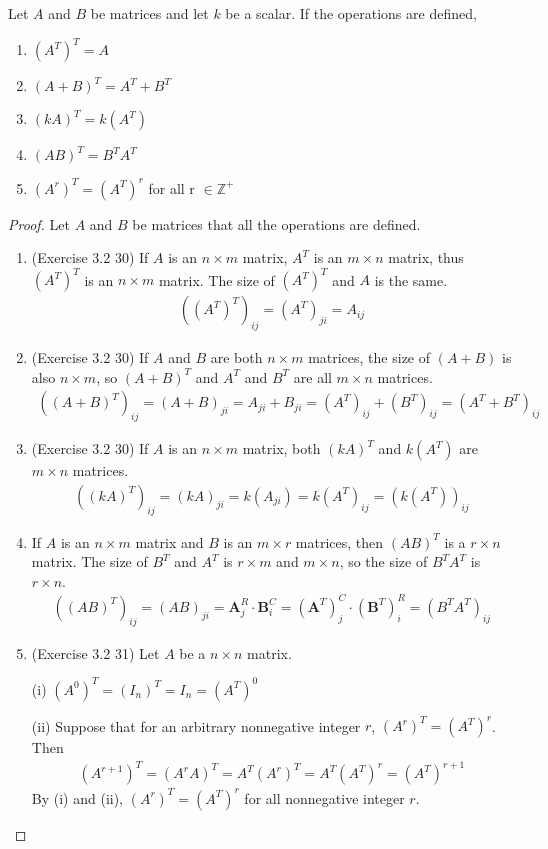 \begin{theorem} 
	Let $A$ and $B$ be matrices and let $k$ be a scalar. If the operations are defined,
	\begin{enumerate}
		\item $(A^{T})^{T} = A$
		\item $(A+B)^{T} = A^{T} + B^{T}$
		\item $(kA)^{T} = k(A^{T})$
		\item $(AB)^{T} = B^{T}A^{T}$
		\item $(A^{r})^{T} = (A^{T})^{r}$ for all r $\in \mathbb{Z}^{+}$
	\end{enumerate}
\end{theorem}

\begin{proof}
	Let $A$ and $B$ be matrices that all the operations are defined.
	\begin{enumerate}
		\item (Exercise 3.2 30) If $A$ is an $n \times m$ matrix, $A^{T}$ is an $m \times n$ matrix, thus $(A^{T})^{T}$ is an $n \times m$ matrix. The size of $(A^{T})^{T}$ and $A$ is the same.
		\begin{align*}
		((A^{T})^{T})_{ij} = (A^{T})_{ji} = A_{ij}			
		\end{align*}
		\item (Exercise 3.2 30) If $A$ and $B$ are both $n \times m$ matrices, the size of $(A+B)$ is also $n \times m$, so $(A+B)^{T}$ and $A^{T}$ and $B^{T}$ are all $m \times n$ matrices.
		\begin{align*}
		((A+B)^{T})_{ij} = (A+B)_{ji} = A_{ji} + B_{ji} = (A^{T})_{ij} + (B^{T})_{ij} = (A^{T} + B^{T})_{ij}
		\end{align*}
		\item (Exercise 3.2 30) If $A$ is an $n \times m$ matrix, both $(kA)^{T}$ and $k(A^{T})$ are $m \times n$ matrices.
		\begin{align*}
		((kA)^{T})_{ij} = (kA)_{ji} = k(A_{ji}) = k(A^{T})_{ij} = (k(A^{T}))_{ij}
		\end{align*}
		\item If $A$ is an $n \times m$ matrix and $B$ is an $m \times r$ matrices, then $(AB)^{T}$ is a $r \times n$ matrix. The size of $B^{T}$ and $A^{T}$ is $r \times m$ and $m \times n$, so the size of $B^{T}A^{T}$ is $r \times n$.
		\begin{align*}
		((AB)^{T})_{ij} = (AB)_{ji} = \textbf{A}^{R}_j \cdot \textbf{B}^{C}_i = (\textbf{A}^{T})^{C}_j \cdot (\textbf{B}^{T})^{R}_i = (B^{T}A^{T})_{ij}
		\end{align*}
		\item (Exercise 3.2 31) Let $A$ be a $n \times n$ matrix.
		
		\noindent (i) $(A^0)^{T} = (I_n)^{T} = I_n = (A^{T})^{0}$
		
		\noindent (ii) Suppose that for an arbitrary nonnegative integer $r$, $(A^r)^T = (A^T)^r$. Then
		\begin{align*}
		(A^{r+1})^T = (A^rA)^T = A^T(A^r)^T = A^T(A^T)^r = (A^T)^{r+1}
		\end{align*}
		By (i) and (ii), $(A^r)^T = (A^T)^r$ for all nonnegative integer $r$.
	\end{enumerate}
\end{proof}

